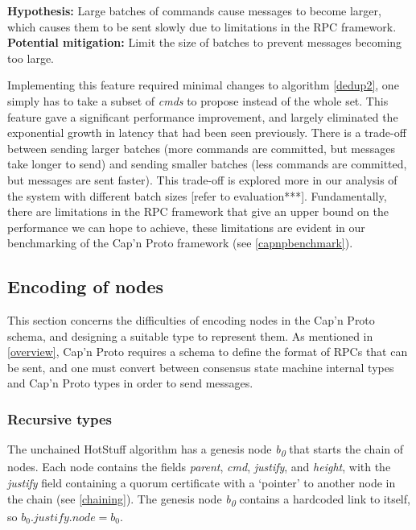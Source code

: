 \textbf{Hypothesis: } Large batches of commands cause messages to become larger, which causes them to be sent slowly due to limitations in the RPC framework.
\textbf{Potential mitigation: } Limit the size of batches to prevent messages becoming too large.

Implementing this feature required minimal changes to algorithm \ref{dedup2}, one simply has to take a subset of \textit{cmds} to propose instead of the whole set. This feature gave a significant performance improvement, and largely eliminated the exponential growth in latency that had been seen previously. There is a trade-off between sending larger batches (more commands are committed, but messages take longer to send) and sending smaller batches (less commands are committed, but messages are sent faster). This trade-off is explored more in our analysis of the system with different batch sizes [refer to evaluation***]. Fundamentally, there are limitations in the RPC framework that give an upper bound on the performance we can hope to achieve, these limitations are evident in our benchmarking of the Cap'n Proto framework (see \ref{capnpbenchmark}).
\subsection{Encoding of nodes}
This section concerns the difficulties of encoding nodes in the Cap'n Proto schema, and designing a suitable type to represent them. As mentioned in \ref{overview}, Cap'n Proto requires a schema to define the format of RPCs that can be sent, and one must convert between consensus state machine internal types and Cap'n Proto types in order to send messages.

\subsubsection{Recursive types}
The unchained HotStuff algorithm has a genesis node \textit{b\textsubscript{0}} that starts the chain of nodes. Each node contains the fields \textit{parent}, \textit{cmd}, \textit{justify}, and \textit{height}, with the \textit{justify} field containing a quorum certificate with a `pointer' to another node in the chain (see \ref{chaining}). The genesis node \textit{b\textsubscript{0}} contains a hardcoded link to itself, so $ b_0.\textit{justify}.\textit{node} = b_0$.

